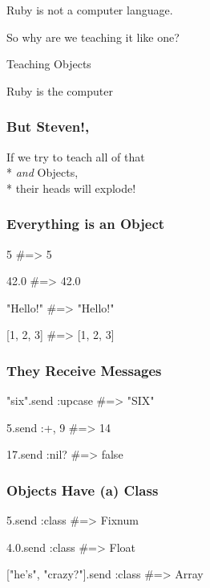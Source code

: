 \documentclass[20pt]{beamer}
\begin{document}
\begin{frame}
\par {Ruby is not a computer language.}
\vspace{4cm}\pause
\par {So why are we teaching it like one?}
\end{frame}

{
\begin{frame}
\par{ Teaching Objects}
\par\vspace{3cm}
\hfill{Ruby is the computer}
\end{frame}
}

\begin{frame}
\frametitle{But Steven!,}
If we try to teach all of that\\* \emph{and} Objects,\\*
their heads will explode!
\end{frame}

\begin{frame}[fragile]
\frametitle{Everything is an Object}
\begin{rubycode}
5 #=> 5

42.0 #=> 42.0

"Hello!" #=> "Hello!"

[1, 2, 3] #=> [1, 2, 3]
\end{rubycode}
\end{frame}

\begin{frame}[fragile]
\frametitle{They  Receive Messages}
\begin{rubycode}
"six".send :upcase
#=> "SIX"

5.send :+, 9
#=> 14

17.send :nil?
#=> false
\end{rubycode}
\end{frame}

\begin{frame}[fragile]
\frametitle{Objects Have (a) Class}
\begin{rubycode}
5.send :class
#=> Fixnum

4.0.send :class
#=> Float

["he's", "crazy?"].send :class
#=> Array
\end{rubycode}
\end{frame}
\end{document}
